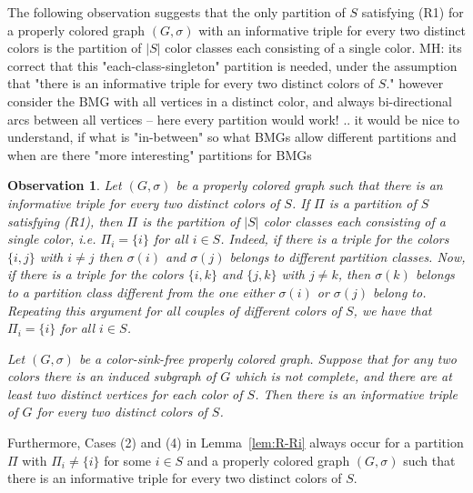 \documentclass[final,3p,times]{elsarticle}
\newtheorem{observ}{Observation}
\newcommand{\TODO}[1]{\begingroup\color{red}#1\endgroup}
\newcommand{\ak}[1]{\begingroup\color{orange}#1\endgroup}
\begin{document}
\ak{
	The following observation suggests that the only partition of $S$ satisfying (R1) for a properly colored graph $(G,\sigma)$ with an informative triple for every two distinct colors is the partition of $|S|$ color classes each consisting of a single color.
	\TODO{MH: its correct that this "each-class-singleton" partition is needed, under the assumption that "there is an informative triple for every two distinct colors of $S$." 
		  however consider the BMG with all vertices in a distinct color, and always bi-directional arcs between all vertices -- here every partition would work!
	.. 
	it would be nice to understand, if what is "in-between" so what BMGs allow different partitions and when are there "more interesting" partitions for BMGs}
	
	\begin{observ}
	Let $(G,\sigma)$ be a properly colored graph such that there is an informative triple for every two distinct colors of $S$. If $\Pi$ is a partition of $S$ satisfying (R1), then $\Pi$ is the partition of $|S|$ color classes each consisting of a single color, i.e. $\Pi_i=\{i\}$ for all $i\in S$. Indeed, if there is a triple for the colors $\{i,j\}$ with $i\neq j$ then $\sigma(i)$ and $\sigma(j)$ belongs to different partition classes. Now, if there is a triple for the colors $\{i,k\}$ and $\{j,k\}$ with $j\neq k$, then $\sigma(k)$ belongs to a partition class different from the one either $\sigma(i)$ or $\sigma(j)$ belong to. Repeating this argument for all couples of different colors of $S$, we have that $\Pi_i=\{i\}$ for all $i\in S$.
	
	Let $(G,\sigma)$ be a color-sink-free properly colored graph. Suppose that for any two colors there is an induced subgraph of $G$ which is not complete, and there are at least two distinct vertices for each color of $S$. Then there is an informative triple of $G$ for every two distinct colors of $S$.
	\end{observ}
	Furthermore, Cases (2) and (4) in Lemma~\ref{lem:R-Ri} always occur for a partition $\Pi$ with $\Pi_i\neq \{i\}$ for some $i\in S$ and a properly colored graph $(G,\sigma)$ such that there is an informative triple for every two distinct colors of $S$.}
\end{document}
